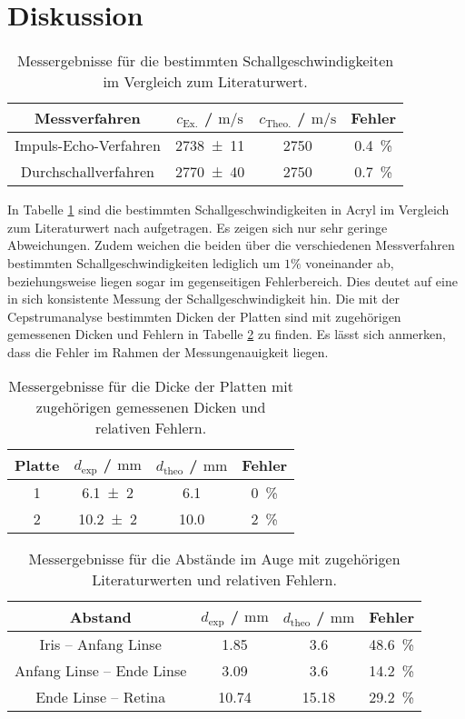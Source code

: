 \section{Diskussion}
\label{sec:Diskussion}
\begin{table}
	\centering
	\caption{Messergebnisse für die bestimmten Schallgeschwindigkeiten im Vergleich zum Literaturwert.}
	\label{tab:schall}
	\begin{tabular}{cccc}
		\toprule
		Messverfahren& $c_\mathrm{Ex.}$ / $\si{\meter\per\second}$ & $c_\mathrm{Theo.}$ / $\si{\meter\per\second}$ & Fehler \\
		\midrule
		Impuls-Echo-Verfahren&\num{2738(11)}&\num{2750}&\SI{0.4}{\percent}\\
		Durchschallverfahren&\num{2770(40)}&\num{2750}&\SI{0.7}{\percent}\\
		\bottomrule
	\end{tabular}
\end{table}
In Tabelle \ref{tab:schall} sind die bestimmten Schallgeschwindigkeiten in Acryl im Vergleich zum Literaturwert nach \cite{schall} aufgetragen.
Es zeigen sich nur sehr geringe Abweichungen. Zudem weichen die beiden über die verschiedenen Messverfahren bestimmten Schallgeschwindigkeiten lediglich um $1\%$ voneinander ab, beziehungsweise liegen sogar im gegenseitigen Fehlerbereich.
Dies deutet auf eine in sich konsistente Messung der Schallgeschwindigkeit hin.
Die mit der Cepstrumanalyse bestimmten Dicken der Platten sind mit zugehörigen gemessenen Dicken
und Fehlern in Tabelle \ref{tab:cepstru} zu finden.
Es lässt sich anmerken, dass die Fehler im Rahmen der Messungenauigkeit liegen.
\begin{table}
	\centering
	\caption{Messergebnisse für die Dicke der Platten mit zugehörigen gemessenen Dicken und relativen Fehlern.}
	\label{tab:cepstru}
	\begin{tabular}{cccc}
	\toprule
		Platte & $d_{\mathrm{exp}}$ / $\si{\milli\meter}$ & $d_{\mathrm{theo}}$ / $\si{\milli\meter}$ & Fehler \\
	\midrule
		1 & \num{6,1(2)}& \num{6,1}& \SI{0}{\percent} \\
		2 & \num{10,2(2)}& \num{10,0}& \SI{2}{\percent} \\
	\bottomrule
	\end{tabular}
\end{table}
\begin{table}
	\centering
	\caption{Messergebnisse für die Abstände im Auge mit zugehörigen Literaturwerten \cite{auge} und relativen Fehlern.}
	\label{tab:augentheorie}
	\begin{tabular}{cccc}
		\toprule
		Abstand & $d_{\mathrm{exp}}$ / $\si{\milli\meter}$ & $d_{\mathrm{theo}}$ / $\si{\milli\meter}$ & Fehler \\
		\midrule
		Iris -- Anfang Linse & \num{1,85} & \num{3,6}& \SI{48,6}{\percent} \\
		Anfang Linse -- Ende Linse & \num{3,09} & \num{3,6}& \SI{14,2}{\percent} \\
		Ende Linse -- Retina & \num{10,74} & \num{15,18} & \SI{29,2}{\percent} \\
		\bottomrule
	\end{tabular}
\end{table}

